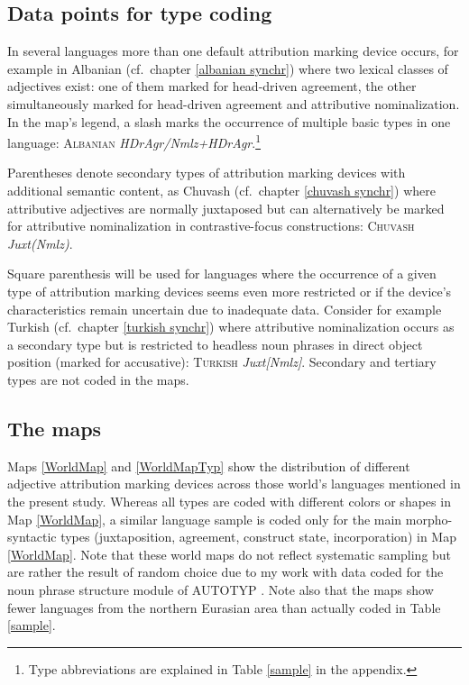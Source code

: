 \subsection[Type coding]{Data points for type coding}
In several languages more than one default attribution marking device occurs, for example in Albanian (cf.~chapter \ref{albanian synchr}) where two lexical classes of adjectives exist: one of them marked for head-driven agreement, the other simultaneously marked for head-driven agreement and attributive nominalization. In the map's legend, a slash marks the occurrence of multiple basic types in one language: \textsc{Albanian} \textit{HDrAgr/Nmlz+HDrAgr}.\footnote{Type abbreviations are explained in Table \ref{sample} in the appendix.}

Parentheses denote secondary types of attribution marking devices with additional semantic content, as Chuvash (cf.~chapter \ref{chuvash synchr}) where attributive adjectives are normally juxtaposed but can alternatively be marked for attributive nominalization in contrastive-focus constructions: \textsc{Chuvash} \textit{Juxt(Nmlz)}.

Square parenthesis will be used for languages where the occurrence of a given type of attribution marking devices seems even more restricted or if the device's characteristics remain uncertain due to inadequate data. Consider for example Turkish (cf.~chapter \ref{turkish synchr}) where attributive nominalization occurs as a secondary type but is restricted to headless noun phrases in direct object position (marked for accusative): \textsc{Turkish} \textit{Juxt[Nmlz]}. 
Secondary and tertiary types are not coded in the maps. 

\subsection{The maps}
Maps \ref{WorldMap} and \ref{WorldMapTyp} show the distribution of different adjective attribution marking devices across those world's languages mentioned in the present study. Whereas all types are coded with different colors or shapes in Map \ref{WorldMap}, a similar language sample is coded only for the main morpho-syntactic types (juxtaposition, agreement, construct state, incorporation) in Map \ref{WorldMap}. Note that these world maps do not reflect systematic sampling but are rather the result of random choice due to my work with data coded for the noun phrase structure module of AUTOTYP \citep{AUTOTYP-NP}. Note also that the maps show fewer languages from the northern Eurasian area than actually coded in Table \ref{sample}.

